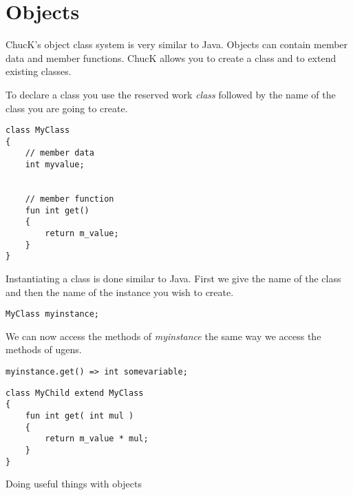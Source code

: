 \chapter{Objects}

ChucK's object class system is very similar to Java. Objects can contain member data and member functions. ChucK allows you to create a class and to extend existing classes. 

To declare a class you use the reserved work {\it class} followed by the name of the class you are going to create. 


\begin{verbatim}
class MyClass
{
    // member data
    int myvalue;


    // member function
    fun int get()
    {
        return m_value;
    }
}

\end{verbatim}

Instantiating a class is done similar to Java. First we give the name of the class and then the name of the instance you wish to create. 

\begin{verbatim}
MyClass myinstance;
\end{verbatim}

We can now access the methods of {\it myinstance} the same way we access the methods of ugens. 


\begin{verbatim}
myinstance.get() => int somevariable;
\end{verbatim}



\begin{verbatim}
class MyChild extend MyClass
{
    fun int get( int mul )
    {
        return m_value * mul;
    }
}

\end{verbatim}


Doing useful things with objects